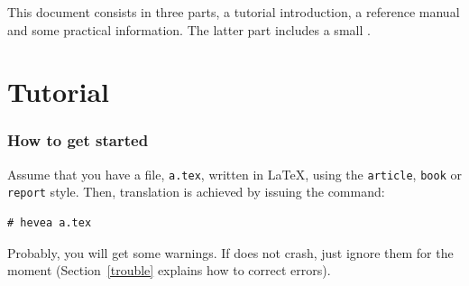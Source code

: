 \begin{abstract}
\hevea{} is a \LaTeX{} to
\html{} translator.
The input language is a fairly complete subset of \LaTeXe{} (old
\LaTeX{} style is also accepted) and the
output language is {\html} that is (hopefully) correct with respect to
version 5\ifhevea{} \cite{html,htmlb} \else.\fi

\hevea{} understands \LaTeX{} macro definitions. Simple user style
files are understood with little or no modifications.
Furthermore, \hevea{} customisation is done by writing \LaTeX{} code.

\hevea{} is written in Objective Caml, as many lexers. It is
quite fast and flexible.  Using \hevea{} it is possible to translate
large documents such as manuals, books, etc. very quickly. All
documents are translated as one single {\html} file. Then, the output
file can be cut into smaller files, using the companion program~\hacha.

\hevea{} can also be instructed to output plain text or info files.

Information on \hevea{} is available at \ahrefurl{\heveaurl/}.
\end{abstract}

\clearpage
{}
\tableofcontents
\cutend

\begin{htmlonly}
This document consists in three parts, a tutorial introduction, a
reference manual and some practical information. The latter part
includes a small .
\end{htmlonly}

\clearpage
{}
\part{\label{usermanual}Tutorial}
\section{How to get\label{getstarted} started}
Assume that you have a file, \texttt{a.tex}, written in \LaTeX, using the
\texttt{article}, \texttt{book} or \texttt{report} style. Then,
translation
is achieved by issuing the command:
\begin{verbatim}
# hevea a.tex
\end{verbatim}
Probably, you will get some warnings. If
\hevea{} does not crash, just ignore them for the moment
(Section~\ref{trouble}  explains how to correct errors).

